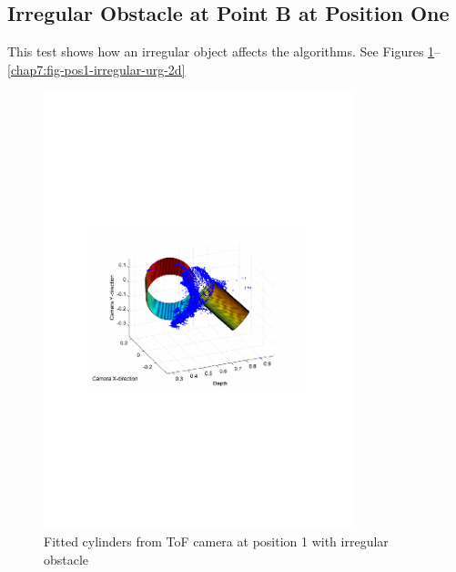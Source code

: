 \subsection{Irregular Obstacle at Point B at Position One}
This test shows how an irregular object affects the algorithms. See Figures 
\ref{chap7:fig-pos1-irregular-tof-3d}--\ref{chap7:fig-pos1-irregular-urg-2d} 
\begin{figure}[htbp]
    \centering
    \includegraphics[width=0.8\textwidth]{pics/pos1-irregular-tof-3d}
    \caption{Fitted cylinders from ToF camera at position 1 with irregular obstacle}
    \label{chap7:fig-pos1-irregular-tof-3d}
\end{figure}
